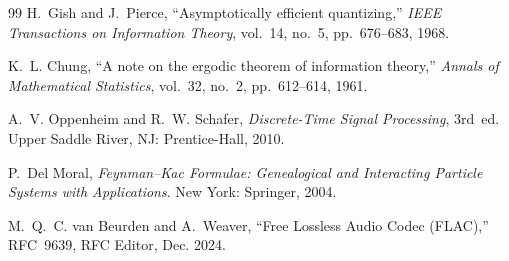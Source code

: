 \documentclass[11pt]{article}
\begin{document}
\begin{thebibliography}{99}
H.~Gish and J.~Pierce, ``Asymptotically efficient quantizing,''
\emph{IEEE Transactions on Information Theory}, vol.~14, no.~5,
pp.~676--683, 1968.

K.~L. Chung, ``A note on the ergodic theorem of information theory,''
\emph{Annals of Mathematical Statistics}, vol.~32, no.~2, pp.~612--614, 1961.

A.~V. Oppenheim and R.~W. Schafer, \emph{Discrete-Time Signal Processing},
3rd~ed. Upper Saddle River, NJ: Prentice-Hall, 2010.

P.~Del Moral, \emph{Feynman--Kac Formulae: Genealogical and Interacting
Particle Systems with Applications}. New York: Springer, 2004.

M.~Q.~C. van Beurden and A.~Weaver, ``Free Lossless Audio Codec (FLAC),''
RFC~9639, RFC Editor, Dec. 2024.

\end{thebibliography}
\end{document}
